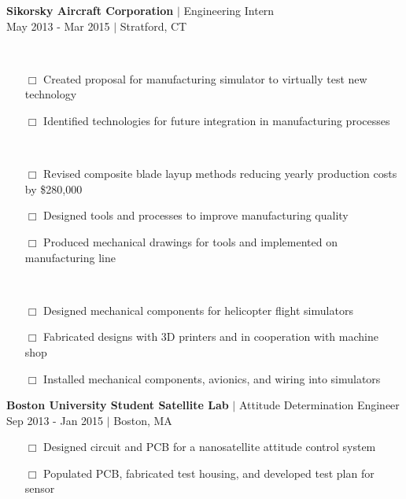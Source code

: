 \documentclass[10pt]{article}
\begin{document}
\begin{minipage}[t]{0.67\textwidth}
\textbf{\sc Sikorsky Aircraft Corporation} $\vert$ {\sc Engineering Intern}\\
{\color{gray} May 2013 - Mar 2015 $\vert$ Stratford, CT }\\
{\small
{\color{gray}{\sc Manufacturing Technology Innovation }}\\[-.4cm]
\begin{itemize}
\item[\tiny $\Box$] Created proposal for manufacturing simulator to virtually test new technology
\item[\tiny $\Box$] Identified technologies for future integration in manufacturing processes
\end{itemize}
{\color{gray}{\sc Blades Engineering}}\\[-.4cm]
\begin{itemize}
\item[\tiny $\Box$] Revised composite blade layup methods reducing yearly production costs by \$280,000
\item[\tiny $\Box$] Designed tools and processes to improve manufacturing quality
\item[\tiny $\Box$] Produced mechanical drawings for tools and implemented on manufacturing line 
\end{itemize}
{\color{gray}{\sc Simulation Engineering}}\\[-.4cm]
\begin{itemize}
\item[\tiny $\Box$] Designed mechanical components for helicopter flight simulators 
\item[\tiny $\Box$] Fabricated designs with 3D printers and in cooperation with machine shop
\item[\tiny $\Box$] Installed mechanical components, avionics, and wiring into simulators \\
\end{itemize}
}

\textbf{Boston University Student Satellite Lab} $\vert$ {\sc Attitude Determination Engineer} \\
{\color{gray} Sep 2013 - Jan 2015 $\vert$ Boston, MA }\\[-.4cm]

\begin{itemize}
\small
\item[\tiny $\Box$] Designed circuit and PCB for a nanosatellite attitude control system
\item[\tiny $\Box$] Populated PCB, fabricated test housing, and developed test plan for sensor \\
\end{itemize}


\end{minipage}
\end{document}
